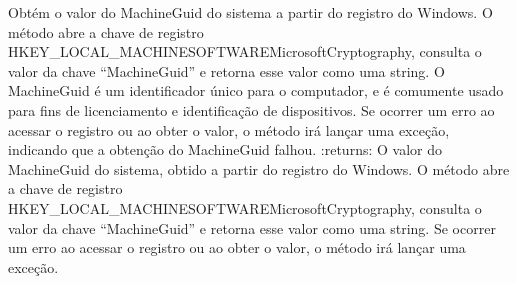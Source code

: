 \documentclass[letterpaper,10pt,english]{sphinxmanual}
\begin{document}
\begin{fulllineitems}
\label{\detokenize{api/online_license:online_license.get_machine_guid}}
\pysigstartsignatures
\pysiglinewithargsret
{}
{}
{}
\pysigstopsignatures
\sphinxAtStartPar
Obtém o valor do MachineGuid do sistema a partir do registro do Windows. O método abre a chave de registro HKEY\_LOCAL\_MACHINESOFTWAREMicrosoftCryptography, consulta o valor da chave “MachineGuid” e retorna esse valor como uma string. O MachineGuid é um identificador único para o computador, e é comumente usado para fins de licenciamento e identificação de dispositivos. Se ocorrer um erro ao acessar o registro ou ao obter o valor, o método irá lançar uma exceção, indicando que a obtenção do MachineGuid falhou.
:returns: O valor do MachineGuid do sistema, obtido a partir do registro do Windows. O método abre a chave de registro HKEY\_LOCAL\_MACHINESOFTWAREMicrosoftCryptography, consulta o valor da chave “MachineGuid” e retorna esse valor como uma string. Se ocorrer um erro ao acessar o registro ou ao obter o valor, o método irá lançar uma exceção.
\begin{quote}\begin{description}
\sphinxAtStartPar
{}

\end{description}\end{quote}

\end{fulllineitems}

\end{document}
